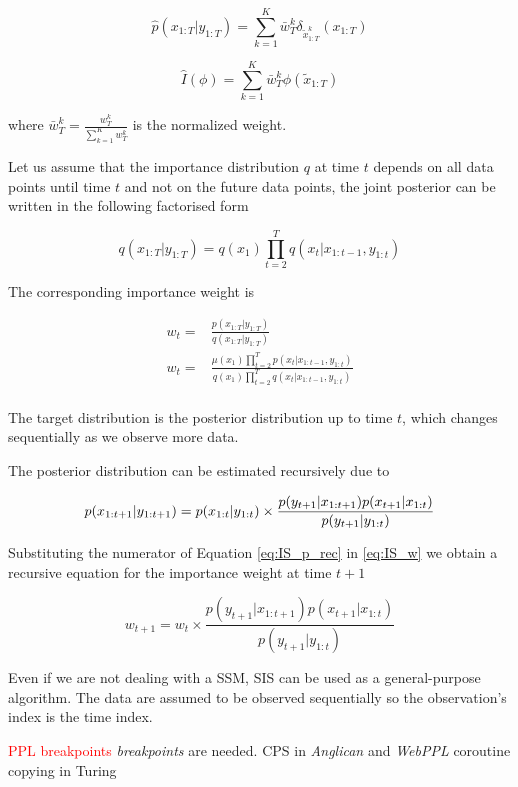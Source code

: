 $$ \hat{p}(x_{1:T}|y_{1:T}) = \sum_{k=1}^K \bar{w}_T^k \delta_{\tilde{x}_{1:T}^k} ({x}_{1:T})$$

$$ \hat{I}(\phi) = \sum_{k=1}^K \bar{w}_T^k \phi(\tilde{x}_{1:T})$$

where $\bar{w}_T^k = \frac{{w}_T^k}{\sum_{k=1}^K {w}_T^k}$ is the normalized weight.



Let us assume that the importance distribution $q$ at time $t$ depends on all data points until time $t$ and not on the future data points, the joint posterior can be written in the following factorised form

$$ q(x_{1:T}|y_{1:T}) = q(x_1) \prod_{t=2}^T q(x_t|x_{1:t-1},y_{1:t}) $$

The corresponding importance weight is

\begin{equation} \label{eq:IS_w}
\begin{aligned}
w_t =& \frac{p(x_{1:T}|y_{1:T})}{q(x_{1:T}|y_{1:T})} \\
w_t =& \frac{\mu(x_1) \prod_{t=2}^T p(x_t|x_{1:t-1},y_{1:t})}{q(x_1) \prod_{t=2}^T q(x_t|x_{1:t-1},y_{1:t})} \\
\end{aligned}
\end{equation}

The target distribution is the posterior distribution up to time $t$, which changes sequentially as we observe more data.


The posterior distribution can be estimated recursively due to

\begin{equation} \label{eq:IS_p_rec}
p(x_{1:t+1}|y_{1:t+1}) = p(x_{1:t}|y_{1:t}) \times \frac{p(y_{t+1}|x_{1:t+1})p(x_{t+1}|x_{1:t})}{p(y_{t+1}|y_{1:t})} \\
\end{equation}

Substituting the numerator of Equation \ref{eq:IS_p_rec} in \ref{eq:IS_w} we obtain a recursive equation for the importance weight at time $t+1$

$$ w_{t+1} = w_{t} \times \frac{p(y_{t+1}|x_{1:t+1})p(x_{t+1}|x_{1:t})}{p(y_{t+1}|y_{1:t})} $$


Even if we are not dealing with a \gls{SSM}, \gls{SIS} can be used as a general-purpose algorithm. The data are assumed to be observed sequentially so the observation’s index is the time index.

\textcolor{red}{PPL breakpoints}
\textit{breakpoints} are needed. \gls{CPS} in \emph{Anglican} \cite{wood-aistats-2014} and \emph{WebPPL} \cite{dippl}
coroutine copying in Turing \cite{Turing}

